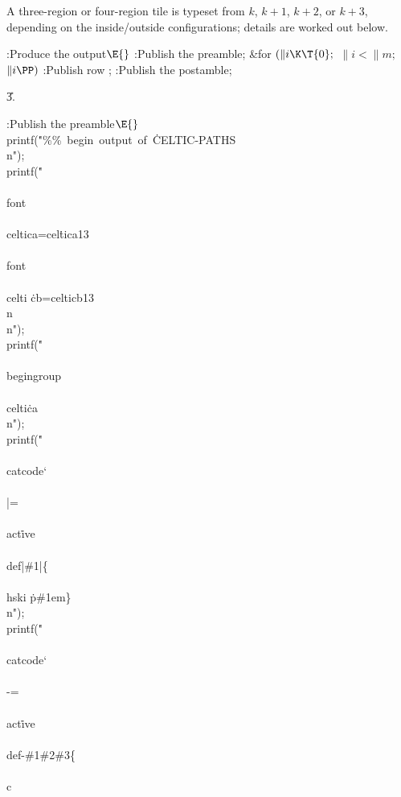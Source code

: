 A three-region or four-region tile is typeset from $k$, $k+1$, $k+2$,
or $k+3$, depending on the inside/outside configurations; details
are worked out below.

\Y\B\4:Produce the output\X${}\E{}$\6
:Publish the preamble\X;\6
\&{for} ${}(\|i\K\T{0};{}$ ${}\|i<\|m;{}$ ${}\|i\PP){}$\1\5
:Publish row \X;\2\6
:Publish the postamble\X;\par
\U3.\fi

\B{}:Publish the preamble\X${}\E{}$\6
\\{printf}(\.{"\%\%\ begin\ output\ of\ }\)\.{CELTIC-PATHS\\n"});\6
\\{printf}(\.{"\\\\font\\\\celtica=cel}\)\.{tica13\ \\\\font\\\\celti}\)%
\.{cb=celticb13\\n\\n"});\6
\\{printf}(\.{"\\\\begingroup\\\\celti}\)\.{ca\\n"});\6
\\{printf}(\.{"\\\\catcode`\\\\|=\\\\act}\)\.{ive\ \\\\def|\#1|\{\\\\hski}\)%
\.{p\#1em\}\\n"});\6
\\{printf}(\.{"\\\\catcode`\\\\-=\\\\act}\)\.{ive\ \\\\def-\#1\#2\#3\{\\\\c}\)%
